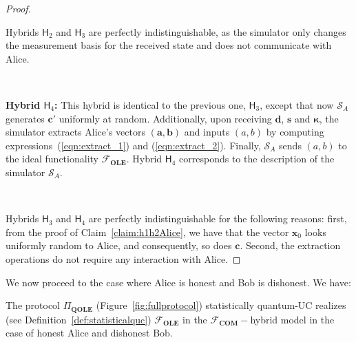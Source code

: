 \begin{proof}
\

 Hybrids $\mathsf{H}_2$ and $ \mathsf{H}_3$ are perfectly indistinguishable, as the simulator only changes the measurement basis for the received state and does not communicate with Alice.

\

\textbf{Hybrid $\mathsf{H}_4$:} This hybrid is identical to the previous one, $\mathsf{H}_3$, except that now $\mathcal{S}_A$ generates $\bm{c}'$ uniformly at random. Additionally, upon receiving $\bm{d}$, $\bm{s}$ and $\bm{\kappa}$, the simulator extracts Alice's vectors $(\bm{a}, \bm{b})$ and inputs $(a, b)$ by computing expressions~(\ref{eqn:extract_1}) and (\ref{eqn:extract_2}). Finally, $\mathcal{S}_A$ sends $(a, b)$ to the ideal functionality $\mathcal{F}_{\textbf{OLE}}$. Hybrid $\mathsf{H}_4$ corresponds to the description of the simulator $\mathcal{S}_A$.

\

Hybrids $\mathsf{H}_3$ and $ \mathsf{H}_4$ are perfectly indistinguishable for the following reasons: first, from the proof of Claim~\ref{claim:h1h2Alice}, we have that the vector $\bm{x}_0$ looks uniformly random to Alice, and consequently, so does $\bm{c}$. Second, the extraction operations do not require any interaction with Alice.
\end{proof}

We now proceed to the case  where Alice is honest and Bob is dishonest. We have:

\begin{lemma}
The protocol $\Pi_{\textbf{QOLE}}$ (Figure~\ref{fig:fullprotocol}) statistically quantum-UC realizes (see Definition~\ref{def:statisticalquc}) $\mathcal{F}_{\textbf{OLE}}$ in the $\mathcal{F}_{\textbf{COM}}-$hybrid model in the case of honest Alice and dishonest Bob.
\label{lemma:dishonestBob}
\end{lemma}

